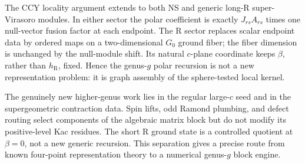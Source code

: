 \documentclass[11pt]{article}
\newcommand{\R}{\mathrm{R}}
\begin{document}
The CCY locality argument extends to both NS and generic long-R
super-Virasoro modules.  In either sector the polar coefficient is exactly
$J_{rs}A_{rs}$ times one null-vector fusion factor at each endpoint.  The R
sector replaces scalar endpoint data by ordered maps on a two-dimensional
$G_0$ ground fiber; the fiber dimension is unchanged by the null-module
shift.  Its natural \(c\)-plane coordinate keeps \(\beta\), rather than
\(h_{\R}\), fixed.  Hence the genus-$g$ polar recursion is not a new representation
problem: it is graph assembly of the sphere-tested local kernel.

The genuinely new higher-genus work lies in the regular large-$c$ seed and
in the supergeometric contraction data.  Spin lifts, odd Ramond plumbing, and
defect routing select components of the algebraic matrix block but do not
modify its positive-level Kac residues.  The short R ground state is a
controlled quotient at $\beta=0$, not a new generic recursion.  This
separation gives a precise route from known four-point representation theory
to a numerical genus-$g$ block engine.

\clearpage


\end{document}
